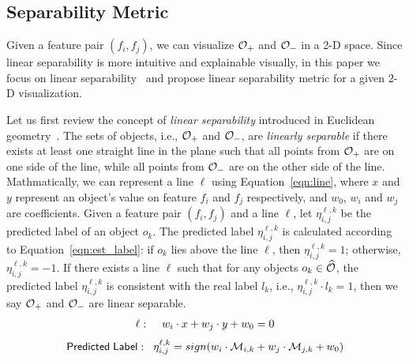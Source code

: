 \subsection{Separability Metric}\label{sec:metric}
Given a feature pair $(f_i,f_j)$, we can visualize $\oo_+$ and $\oo_-$ in a 2-D space. Since linear separability is more intuitive and explainable visually, in this paper we focus on linear separability~\cite{shamos1975geometric} and propose linear separability metric for a given 2-D visualization. 

Let us first review the concept of {\em linear separability} introduced in Euclidean geometry~\cite{shamos1975geometric}. The sets of objects, i.e., $\oo_+$ and $\oo_-$, are \emph{linearly separable} if there exists at least one straight line in the plane such that all points from $\oo_+$ are on one side of the line, while all points from $\oo_-$ are on the other side of the line. Mathmatically, we can represent a line $\ell$ using Equation~\ref{eqn:line}, where $x$ and $y$ represent an object's value on feature $f_i$ and $f_j$ respectively, and $w_0$, $w_i$ and $w_j$ are coefficients. Given a feature pair $(f_i,f_j)$ and a line $\ell$, let $\eta_{i,j}^{\ell,k}$ be the predicted label of an object $o_k$. The predicted label $\eta_{i,j}^{\ell,k}$ is calculated according to Equation~\ref{eqn:est_label}: if $o_k$ lies above the line $\ell$, then $\eta_{i,j}^{\ell,k}=1$; otherwise, $\eta_{i,j}^{\ell,k}=-1$.   
If there exists a line $\ell$ such that for any objects $o_k\in \widehat{\oo}$, the predicted label $\eta_{i,j}^{\ell,k}$ is consistent with the real label $l_k$, i.e., $\eta_{i,j}^{\ell,k}\cdot l_k = 1$, then we say $\oo_+$ and $\oo_-$ are linear separable. 
\begin{equation}\label{eqn:line}
\begin{split}
\ell: \hspace{4mm} w_i\cdot x + w_j\cdot y +w_0 =0 
\end{split}
\end{equation}
\begin{equation}\label{eqn:est_label}
{\sf Predicted \hspace{1mm} Label:}\hspace{3mm} \eta_{i,j}^{\ell,k}=sign(w_i\cdot \mm_{i,k} + w_j\cdot \mm_{j,k} +w_0)
\end{equation}

